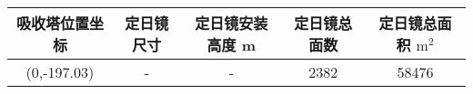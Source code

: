 \begin{tabular}{|c|c|c|c|c|}
\hline
吸收塔位置坐标 & 定日镜尺寸 & 定日镜安装高度 m & 定日镜总面数 & 定日镜总面积 \(\mathrm{m}^{2}\)\\
\hline
(0,-197.03) & - & - & 2382 & 58476\\
\hline
\end{tabular}
